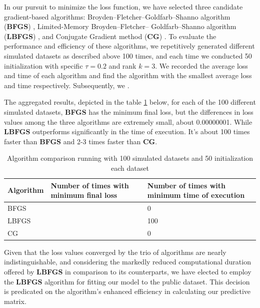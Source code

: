\documentclass{article}
\begin{document}
In our pursuit to minimize the loss function, we have selected three candidate gradient-based algorithms: Broyden–Fletcher–Goldfarb–Shanno algorithm (\textbf{BFGS}) \cite{35d0019d-775a-3628-b0b4-67be112e346b}, Limited-Memory Broyden–Fletcher– Goldfarb–Shanno algorithm (\textbf{LBFGS}) \cite{liu1989limited}, and Conjugate Gradient method (\textbf{CG}) \cite{hestenes1952methods}. To evaluate the performance and efficiency of these algorithms, we repetitively generated different simulated datasets as described above 100 times, and each time we conducted 50 initialization with specific $\tau = 0.2$ and rank $k = 3$. We recorded the average loss and time of each algorithm and find the algorithm with the smallest average loss and time respectively. Subsequently, we .

The aggregated results, depicted in the table \ref{tab:algorithm_simulation} below, for each of the 100 different simulated datasets, \textbf{BFGS} has the minimum final loss, but the differences in loss values among the three algorithms are extremely small, about 0.00000001. While \textbf{LBFGS} outperforms significantly in the time of execution. It's about 100 times faster than \textbf{BFGS} and 2-3 times faster than \textbf{CG}.

\begin{table}[H]
    \centering
    \begin{tabular}{|p{2cm}|p{4.5cm}|p{4.5cm}|}
    \hline
     \textbf{Algorithm}    & Number of times with minimum final loss & Number of times with minimum time of execution \\
     \hline
     BFGS    &  & 0\\
     \hline
     LBFGS & & 100\\
     \hline
     CG & & 0\\
     \hline
    \end{tabular}
    \caption{Algorithm comparison running with 100 simulated datasets and 50 initialization each dataset}
    \label{tab:algorithm_simulation}
\end{table}

Given that the loss values converged by the trio of algorithms are nearly indistinguishable, and considering the markedly reduced computational duration offered by \textbf{LBFGS} in comparison to its counterparts, we have elected to employ the \textbf{LBFGS} algorithm for fitting our model to the public dataset. This decision is predicated on the algorithm's enhanced efficiency in calculating our predictive matrix.
\end{document}
